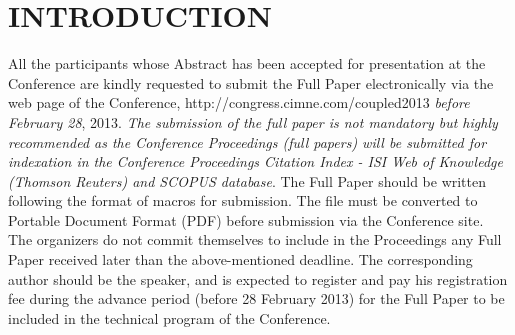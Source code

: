 \section{INTRODUCTION}

All the participants whose Abstract has been accepted for presentation at the Conference are kindly requested to submit the Full Paper electronically via the web page of the Conference, http://congress.cimne.com/coupled2013 \emph{before  February 28}, 2013. {\it The submission of the full paper is not mandatory but highly recommended as the Conference Proceedings (full papers) will be submitted for indexation in the Conference Proceedings Citation Index - ISI Web of Knowledge (Thomson Reuters) and SCOPUS database}. The Full Paper should be written following the format of macros for submission. The file must be converted to  Portable Document Format (PDF) before submission via the Conference site. The organizers do not commit themselves to include in the Proceedings any Full Paper received later than the above-mentioned deadline. The corresponding author should be the speaker, and is expected to register and pay his registration fee during the advance period (before 28 February 2013) for the Full Paper to be included in the technical program of the Conference.